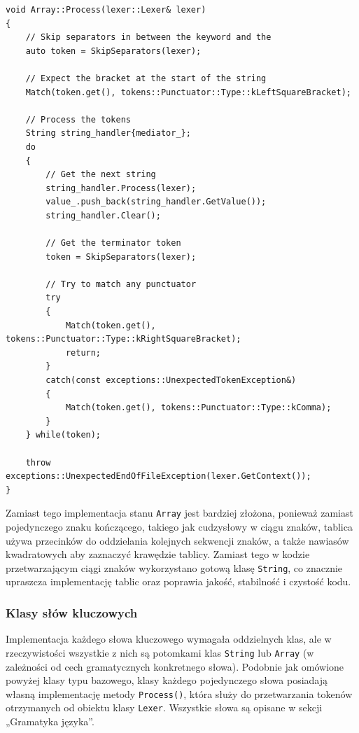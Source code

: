 \begin{lstlisting}[label=list:array,caption=Metoda Array::Process(),basicstyle=\footnotesize\ttfamily]
void Array::Process(lexer::Lexer& lexer)
{
    // Skip separators in between the keyword and the
    auto token = SkipSeparators(lexer);

    // Expect the bracket at the start of the string
    Match(token.get(), tokens::Punctuator::Type::kLeftSquareBracket);

    // Process the tokens
    String string_handler{mediator_};
    do
    {
        // Get the next string
        string_handler.Process(lexer);
        value_.push_back(string_handler.GetValue());
        string_handler.Clear();

        // Get the terminator token
        token = SkipSeparators(lexer);

        // Try to match any punctuator
        try
        {
            Match(token.get(), tokens::Punctuator::Type::kRightSquareBracket);
            return;
        }
        catch(const exceptions::UnexpectedTokenException&)
        {
            Match(token.get(), tokens::Punctuator::Type::kComma);
        }
    } while(token);

    throw exceptions::UnexpectedEndOfFileException(lexer.GetContext());
}
\end{lstlisting}

Zamiast tego implementacja stanu \texttt{Array} jest bardziej złożona, ponieważ zamiast pojedynczego znaku kończącego, takiego jak cudzysłowy w ciągu znaków, tablica używa przecinków do oddzielania kolejnych sekwencji znaków, a także nawiasów kwadratowych aby zaznaczyć krawędzie tablicy. Zamiast tego w kodzie przetwarzającym ciągi znaków wykorzystano gotową klasę \texttt{String}, co znacznie upraszcza implementację tablic oraz poprawia jakość, stabilność i czystość kodu.

\subsubsection{Klasy słów kluczowych}

Implementacja każdego słowa kluczowego wymagała oddzielnych klas, ale w rzeczywistości wszystkie z nich są potomkami klas \texttt{String} lub \texttt{Array} (w zależności od cech gramatycznych konkretnego słowa). Podobnie jak omówione powyżej klasy typu bazowego, klasy każdego pojedynczego słowa posiadają własną implementację metody \texttt{Process()}, która służy do przetwarzania tokenów otrzymanych od obiektu klasy \texttt{Lexer}. Wszystkie słowa są opisane w sekcji „Gramatyka języka”.

